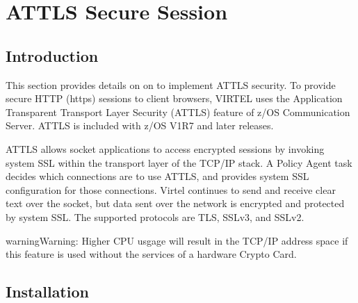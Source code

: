 \documentclass[letterpaper,10pt,english]{sphinxmanual}
\begin{document}
\ignorespaces 

\chapter{AT\sphinxhyphen{}TLS Secure Session}
\label{\detokenize{connectivity_guide:at-tls-secure-session}}\label{\detokenize{connectivity_guide:index-162}}

\section{Introduction}
\label{\detokenize{connectivity_guide:id75}}
\sphinxAtStartPar
This section provides details on on to implement AT\sphinxhyphen{}TLS security. To provide secure HTTP (https) sessions to client browsers, VIRTEL uses the Application Transparent Transport Layer Security (AT\sphinxhyphen{}TLS) feature of z/OS Communication Server. AT\sphinxhyphen{}TLS is included with z/OS V1R7 and later releases.

\sphinxAtStartPar
AT\sphinxhyphen{}TLS allows socket applications to access encrypted sessions by invoking system SSL within the transport layer of the TCP/IP stack. A Policy Agent task decides which connections are to use AT\sphinxhyphen{}TLS, and provides system SSL configuration for those connections. Virtel continues to send and receive clear text over the socket, but data sent over the network is encrypted and protected by system SSL. The supported protocols are TLS, SSLv3, and SSLv2.

\begin{sphinxadmonition}{warning}{Warning:}
\sphinxAtStartPar
Higher CPU usgage will result in the TCP/IP address space if this feature is used without the services of a hardware Crypto Card.
\end{sphinxadmonition}

\ignorespaces 

\section{Installation}
\label{\detokenize{connectivity_guide:installation}}\label{\detokenize{connectivity_guide:index-163}}
\end{document}
